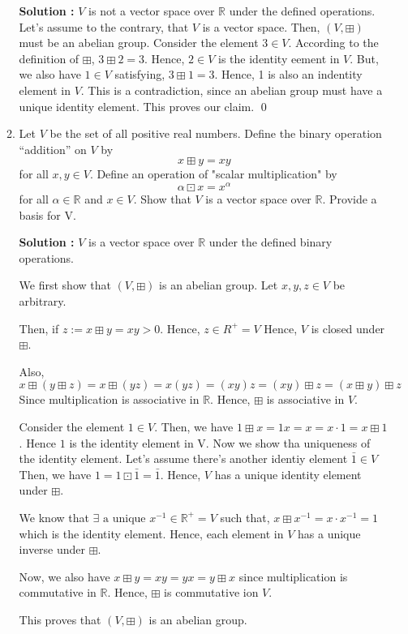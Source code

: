 \documentclass[10pt]{scrartcl}
\newcommand{\rn}{\mathbb{R}}
\begin{document}
\begin{enumerate}
\begin{enumerate}[label={(\roman*)}]
        \textbf{Solution : }$V$ is not a vector space over $\rn$ under the defined operations. Let's assume to the contrary, that $V$ is a vector space. Then, $(V, \boxplus)$ must be an abelian group. Consider the element $3 \in V$. According to the definition of $\boxplus$, $3 \boxplus 2 = 3$. Hence, $2 \in V$ is the identity eement in $V$. But, we also have $1 \in V$ satisfying, $3 \boxplus 1 = 3$. Hence, 1 is also an  indentity element in $V$. This is a contradiction, since an abelian group must have a unique identity element. This proves our claim. \qed
        \item Let $V$ be the set of all positive real numbers. Define the binary operation “addition” on $V$ by $$x \boxplus y = xy$$ for all $x, y \in V$. Define an operation of "scalar multiplication" by $$\alpha \boxdot x = x^\alpha$$ for all $\alpha \in \rn$ and $x \in V$. Show that $V$ is a vector space over $\rn$. Provide a basis for V.

        \textbf{Solution : } $V$ is a vector space over $\rn$ under the defined binary operations. 

        We first show that $(V, \boxplus)$ is an abelian group. Let $x, y, z \in V$ be arbitrary. 

        Then, if $z := x \boxplus y = xy > 0$. Hence, $z \in R^+ = V$ Hence, $V$ is closed under $\boxplus$.

        Also, $x \boxplus (y \boxplus z) = x \boxplus (yz) = x(yz) = (xy)z = (xy) \boxplus z = (x \boxplus y) \boxplus z$
        Since multiplication is associative in $\rn$. Hence, $\boxplus$ is associative in $V$. 
        
        Consider the element $1 \in V$. Then, we have $1 \boxplus x = 1x = x = x\cdot1 = x \boxplus 1$. Hence $1$ is the identity element in V.
        Now we show tha uniqueness of the identity element. Let's assume there's another identiy element $\bar{1} \in V$
        Then, we have $1 = 1 \boxdot \bar{1} = \bar{1}$. Hence, $V$ has a unique identity element under $\boxplus$.

        We know that $\exists \text{ a unique } x^{-1} \in \rn^+ = V$ such that, $x \boxplus x^{-1} = x \cdot x^{-1} = 1$ which is the identity element.
        Hence, each element in $V$ has a unique inverse under $\boxplus$.
 
        Now, we also have $x \boxplus y = xy = yx = y \boxplus x$ since multiplication is commutative
        in $\rn$. Hence, $\boxplus$ is commutative ion $V$.
        
        This proves that $(V, \boxplus)$ is an abelian group.


\end{enumerate}
\end{enumerate}
\end{document}
